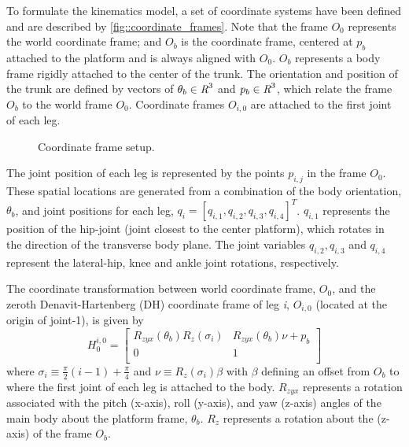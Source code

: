 			To formulate the kinematics model, a set of coordinate systems have been defined and are described by \ref{fig::coordinate_frames}. Note that the frame $O_{0}$ represents the world coordinate frame; and $O_{b}$ is the coordinate frame, centered at  ${p}_{b}$ attached to the platform and is always aligned with $O_{0}$. $O_{b}$ represents a body frame rigidly attached to the center of the trunk. The orientation and position of the trunk are defined by vectors of $\theta_{b}\in\emph{R}^{3}$ and ${p}_{b}\in\emph{R}^{3}$, which relate the frame $O_{b}$ to the world frame $O_{0}$. Coordinate frames $O_{i,0}$ are attached to the first joint of each \Ith leg.
%
				\begin{figure}[h!]
					\centering
					\caption{Coordinate frame setup.}
					\label{fig::narx_net}
				\end{figure}
%
			The \Jth joint position of each \Ith leg is represented  by the points ${p}_{i,j}$ in the frame $O_{0}$. These spatial locations are generated from a combination of the body orientation, $\theta_{b}$, and joint positions for each \Ith leg, $q_{i} = [q_{i,1}, q_{i,2}, q_{i,3}, q_{i,4}]^T$. $q_{i,1}$ represents the position of the hip-joint (joint closest to the center platform), which rotates in the direction of the transverse body plane. The joint variables $q_{i,2}, q_{i,3}$ and $q_{i,4}$ represent the lateral-hip, knee and ankle joint rotations, respectively.

			The coordinate transformation between world coordinate frame, $O_{0}$, and the zeroth Denavit-Hartenberg (DH) coordinate frame of leg \emph{i}, $O_{i,0}$ (located at the origin of joint-1), is given by
				\begin{equation}
					H_{0}^{i,0} = \left[ 
					\begin{array}{c|c}
						R_{zyx}(\theta_{b}) R_{z}(\sigma_{i})	&R_{zyx}(\theta_{b}) \nu + {p}_{b} 	\\ \hline
						0										&	1											\\
					\end{array} 
					\right]
					\label{eq::world_to_dh}
				\end{equation}
			where $\sigma_{i} \equiv \frac{\pi}{2}(i-1) + \frac{\pi}{4} $ and $\nu \equiv  R_{z}(\sigma_{i}) \beta$ with $\beta$ defining an offset from $O_{b}$ to where the first joint of each leg is attached to the body. $R_{zyx}$ represents a rotation associated with the pitch (x-axis), roll (y-axis), and yaw (z-axis) angles of the main body about the platform frame, $\theta_{b}$. $R_{z}$ represents a rotation about the (z-axis) of the frame $O_{b}$. 


